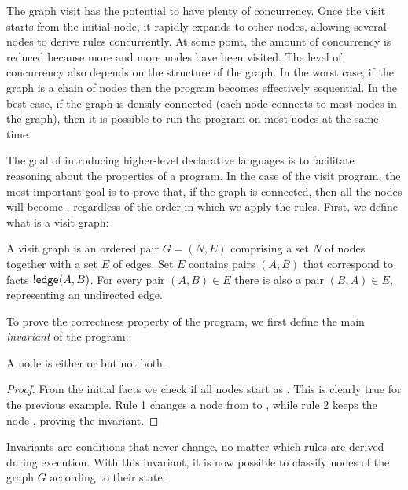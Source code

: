 The graph visit has the potential to have plenty of concurrency. Once the visit
starts from the initial node, it rapidly expands to other nodes, allowing
several nodes to derive rules concurrently. At some point, the amount of
concurrency is reduced because more and more nodes have been visited. The level
of concurrency also depends on the structure of the graph. In the worst case, if
the graph is a chain of nodes then the program becomes effectively sequential.
In the best case, if the graph is densily connected (each node connects to most
nodes in the graph), then it is possible to run the program on most nodes at the
same time.

The goal of introducing higher-level declarative languages is to facilitate
reasoning about the properties of a program. In the case of the visit program,
the most important goal is to prove that, if the graph is connected, then all
the nodes will become , regardless of the order in which we apply
the rules. First, we define what is a visit graph:

\begin{definition}
A visit graph is an ordered pair $G = (N, E)$ comprising a set $N$ of nodes together
with a set $E$ of edges. Set $E$ contains pairs $(A, B)$ that correspond to
facts ${!} \mathtt{edge}(A, B)$. For every pair $(A, B) \in E$ there is also a
pair $(B, A) \in E$, representing an undirected edge.
\end{definition}

To prove the correctness property of the program, we first define the main
\emph{invariant} of the program:

\begin{invariant}
A node is either  or  but not both.
\end{invariant}

\begin{proof}

From the initial facts we check if all nodes start as . This is
clearly true for the previous example. Rule 1 changes a node from
 to , while rule 2 keeps the node ,
proving the invariant.

\end{proof}

Invariants are conditions that never change, no matter which rules are derived
during execution. With this invariant, it is now possible to classify nodes of
the graph $G$ according to their state:

